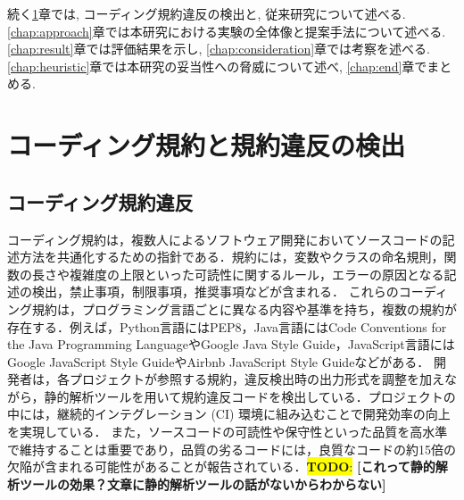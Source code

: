 \documentclass[submit]{ipsj}
\newcommand{\todo}[1]{\colorbox{yellow}{{\bf TODO}:}{\color{red} {\textbf{[#1]}}}}
\begin{document}

続く\ref{chap:background}章では, コーディング規約違反の検出と, 従来研究について述べる. \ref{chap:approach}章では本研究における実験の全体像と提案手法について述べる. \ref{chap:result}章では評価結果を示し, \ref{chap:consideration}章では考察を述べる. \ref{chap:heuristic}章では本研究の妥当性への脅威について述べ, \ref{chap:end}章でまとめる.



\section{コーディング規約と規約違反の検出}\label{chap:background}

\subsection{コーディング規約違反}

コーディング規約は，複数人によるソフトウェア開発においてソースコードの記述方法を共通化するための指針である．規約には，変数やクラスの命名規則，関数の長さや複雑度の上限といった可読性に関するルール，エラーの原因となる記述の検出，禁止事項，制限事項，推奨事項などが含まれる．
これらのコーディング規約は，プログラミング言語ごとに異なる内容や基準を持ち，複数の規約が存在する．例えば，Python言語にはPEP8，Java言語にはCode Conventions for the Java Programming LanguageやGoogle Java Style Guide，JavaScript言語にはGoogle JavaScript Style GuideやAirbnb JavaScript Style Guideなどがある．
開発者は，各プロジェクトが参照する規約，違反検出時の出力形式を調整を加えながら，静的解析ツールを用いて規約違反コードを検出している．プロジェクトの中には，継続的インテグレーション (CI) 環境に組み込むことで開発効率の向上を実現している\cite{ci/cd}．
また，ソースコードの可読性や保守性といった品質を高水準で維持することは重要であり，品質の劣るコードには，良質なコードの約15倍の欠陥が含まれる可能性があることが報告されている\cite{静的解析ツールの効果}．\todo{これって静的解析ツールの効果？文章に静的解析ツールの話がないからわからない}
\end{document}
